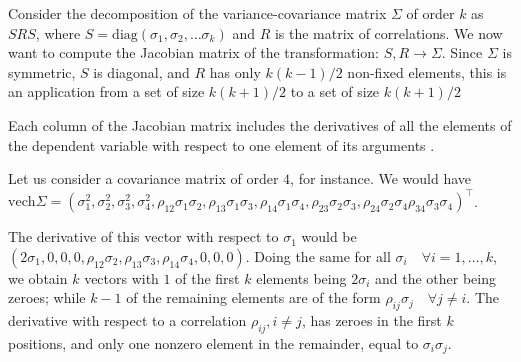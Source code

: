 \documentclass{article}
\begin{document}
Consider the decomposition of the variance-covariance matrix $\Sigma$ of order $k$ as $SRS$, where $S = \mathrm{diag}(\sigma_1, \sigma_2, \dots \sigma_k)$ and $R$ is the matrix of correlations. We now want to compute the Jacobian matrix of the transformation: $S, R \rightarrow \Sigma$. 
Since $\Sigma$ is symmetric, $S$ is diagonal, and $R$ has only $k(k-1)/2$ non-fixed elements, this is an application from a set of size $k(k+1)/2$ to a set of size $k(k+1)/2$



Each column of the Jacobian matrix includes the derivatives of all the elements of the dependent variable with respect to one element of its arguments \cite{Magnus}. 

Let us consider a covariance matrix of order $4$, for instance. We would have $\mathrm{vech} \Sigma = (\sigma_1^2, \sigma_2^2, \sigma_3^2, \sigma_4^2, \rho_{12} \sigma_1 \sigma_2, \rho_{13} \sigma_1 \sigma_3, \rho_{14} \sigma_1 \sigma_4, \rho_{23} \sigma_2 \sigma_3, \rho_{24} \sigma_2 \sigma_4 \rho_{34} \sigma_3 \sigma_4   )^\top$. 

The derivative of this vector with respect to $\sigma_1$ would be $(2 \sigma_1, 0,0,0, \rho_{12} \sigma_2, \rho_{13} \sigma_3, \rho_{14} \sigma_4, 0, 0, 0)$. Doing the same for all $\sigma_i \quad \forall i = 1, \dots, k$, we obtain $k$ vectors with $1$ of the first $k$ elements being $2 \sigma_i$ and the other being zeroes; while $k-1$ of the remaining elements are of the form $\rho_{ij} \sigma_j \quad \forall j \neq i$. 
The derivative with respect to a correlation $\rho_{ij}, i \neq j$, has zeroes in the first $k$ positions, and only one nonzero element in the remainder, equal to $\sigma_i \sigma_j$. 
\end{document}
